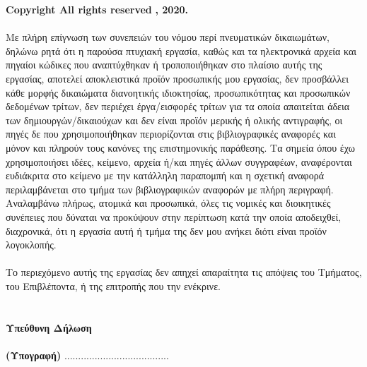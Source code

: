 \vspace{2.5cm}
{\bf \lt Copyright \textcopyright  All rights reserved} {\bf {}, 2020.}
\\
\vspace{0.5cm}
\\
{ Με πλήρη επίγνωση των συνεπειών του νόμου περί πνευματικών δικαιωμάτων, δηλώνω ρητά ότι η παρούσα πτυχιακή εργασία, καθώς και τα ηλεκτρονικά αρχεία και πηγαίοι κώδικες που αναπτύχθηκαν ή τροποποιήθηκαν στο πλαίσιο αυτής της εργασίας, αποτελεί αποκλειστικά προϊόν προσωπικής μου εργασίας, δεν προσβάλλει κάθε μορφής δικαιώματα διανοητικής ιδιοκτησίας, προσωπικότητας και προσωπικών δεδομένων τρίτων, δεν περιέχει έργα/εισφορές τρίτων για τα οποία απαιτείται άδεια των δημιουργών/δικαιούχων και δεν είναι προϊόν μερικής ή ολικής αντιγραφής, οι πηγές δε που χρησιμοποιήθηκαν περιορίζονται στις βιβλιογραφικές αναφορές και μόνον και πληρούν τους κανόνες της επιστημονικής παράθεσης. Τα σημεία όπου έχω χρησιμοποιήσει ιδέες, κείμενο, αρχεία ή/και πηγές άλλων συγγραφέων, αναφέρονται ευδιάκριτα στο κείμενο με την κατάλληλη παραπομπή και η σχετική αναφορά περιλαμβάνεται στο τμήμα των βιβλιογραφικών αναφορών με πλήρη περιγραφή. Αναλαμβάνω πλήρως, ατομικά και προσωπικά, όλες τις νομικές και διοικητικές συνέπειες που δύναται να προκύψουν στην περίπτωση κατά την οποία αποδειχθεί, διαχρονικά, ότι η εργασία αυτή ή τμήμα της δεν μου ανήκει διότι είναι προϊόν λογοκλοπής.}
\\
\vspace{0.5cm}
\\
{ Το περιεχόμενο αυτής της εργασίας δεν απηχεί απαραίτητα τις απόψεις του Τμήματος, του
Επιβλέποντα, ή της επιτροπής που την ενέκρινε.}
\\
\vspace{0.5cm}
\\
\\
{\bfseries Υπεύθυνη Δήλωση}
\\ \\
{\bfseries (Υπογραφή)}
......................................
\ \\\\
{ \bfseries {}}